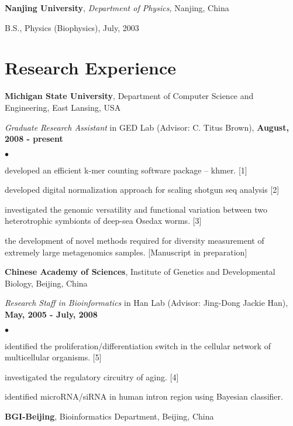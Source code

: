 \documentclass[margin,line]{res}
\newenvironment{list1}{
  \begin{list}{\ding{113}}{%
      \setlength{\itemsep}{0in}
      \setlength{\parsep}{0in} \setlength{\parskip}{0in}
      \setlength{\topsep}{0in} \setlength{\partopsep}{0in} 
      \setlength{\leftmargin}{0.17in}}}{\end{list}}
\newenvironment{list2}{
  \begin{list}{$\bullet$}{%
      \setlength{\itemsep}{0in}
      \setlength{\parsep}{0in} \setlength{\parskip}{0in}
      \setlength{\topsep}{0in} \setlength{\partopsep}{0in} 
      \setlength{\leftmargin}{0.2in}}}{\end{list}}
\begin{document}
\begin{resume}
{\bf Nanjing University}, {\em Department of Physics,} Nanjing, China\\
\vspace*{-.1in}
\begin{list1}
\item[] B.S., Physics (Biophysics),  July, 2003
\end{list1}


\section{\sc Research Experience}
{\bf Michigan State University}, Department of Computer Science and 
Engineering, East Lansing, USA

{\em Graduate Research Assistant} in GED Lab (Advisor: C. Titus Brown),
\hfill {\bf August, 2008 - present}

\begin{list2}

    \item developed an efficient k-mer counting software package – 
    khmer. [1]
    \item developed digital normalization approach for scaling shotgun seq analysis [2]
    \item investigated the genomic versatility and functional variation 
    between two heterotrophic symbionts of deep-sea Osedax worms. [3]
    \item the development of novel methods required for diversity measurement 
    of extremely large metagenomics samples. [Manuscript in preparation]
\end{list2}

{\bf Chinese Academy of Sciences}, Institute of Genetics and Developmental 
Biology, Beijing, China

{\em Research Staff in Bioinformatics} in Han Lab (Advisor: Jing-Dong Jackie 
Han), \hfill {\bf May, 2005 - July, 2008}

\begin{list2}

    \item identified the proliferation/differentiation switch in the 
    cellular network of multicellular organisms. [5]
    \item investigated the regulatory circuitry of aging. [4]
    \item identified microRNA/siRNA in human intron region using 
    Bayesian classifier.
\end{list2}

{\bf BGI-Beijing}, Bioinformatics Department, Beijing, China


\end{resume}
\end{document}

